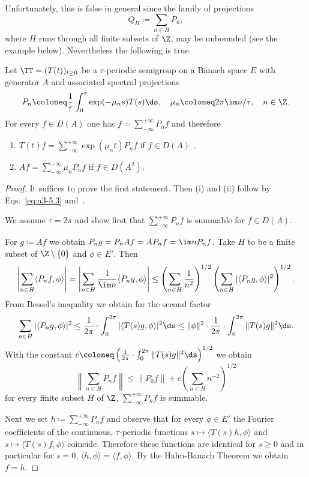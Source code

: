 Unfortunately, this is false in general since the family of projections
\[
Q_{H} \coloneq \sum_{n \in H} P_{n} ,
\]
where $H$ runs through all finite subsets of\/ $\Z$, may be unbounded (see the example below).
Nevertheless the following is true.
\begin{theorem}\label{thm:a3-5.4}
Let $\TT = (T(t))_{t \geq 0}$ be a $\tau$-periodic semigroup on a Banach space $E$ with generator $A$ and associated spectral projections
\[
P_{n} \coloneq  \frac{1}{\tau}\int_{0}^{\tau} \exp(-\mu_{n}s)T(s) \ds, \quad \mu_{n} \coloneq 2\pi\im n/\tau, \quad n \in \Z  .
\]
For every $f \in D(A)$ one has $f = \sum_{-\infty}^{+\infty} P_{n}f$ and therefore
\begin{enumerate}[\upshape (i)]
\item 
$T(t)f = \sum_{-\infty}^{+\infty} \exp(\mu_{n}t)P_{n}f$ \quad if\/ $f \in D(A)$ ,

\item 
$Af = \sum_{-\infty}^{+\infty} \mu_{n}P_{n}f$ \quad if\/ $f \in D(A^{2})$. 
\end{enumerate}
\end{theorem}
\begin{proof}
It suffices to prove the first statement. Then (i) and (ii) follow by Eqs.~\eqref{eq:a3-5.3} and~.

We assume $\tau = 2\pi$ and show first that $\sum_{-\infty}^{+\infty} P_{n}f$ is summable for $f \in D(A)$.

For $g \coloneq Af$ we obtain $P_{n}g = P_{n}Af = AP_{n}f = \im nP_{n}f$.
Take $H$ to be a finite subset of\/ $\Z \setminus \{0\}$ and $\phi \in E'$. Then
\[
\left|\sum_{n \in H} \langle P_{n}f,\phi \rangle\right|
= \left|\sum_{n \in H} \frac{1}{\im n} \langle P_{n}g,\phi \rangle\right| 
\leq \left(\sum_{n \in H} \frac{1}{n^2}\right)^{1/2}\left(\sum_{n \in H} |\langle P_{n}g,\phi \rangle|^{2}\right)^{1/2} .
\]
From Bessel's inequality we obtain for the second factor
\[
\sum_{n \in H} |\langle P_{n}g,\phi \rangle|^{2} \leq \frac{1}{2\pi} \cdot \int_{0}^{2\pi} |\langle T(s)g,\phi \rangle|^{2}  \ds 
\leq \|\phi\|^{2} \cdot \frac{1}{2\pi} \cdot \int_{0}^{2\pi} \|T(s)g\|^{2}  \ds  .
\]
With the constant $c \coloneq \left(\frac{1}{2\pi} \cdot \int_{0}^{2\pi} \|T(s)g\|^{2} \ds\right)^{1/2}$ we obtain
\[
\left\|\sum_{n \in H} P_{n}f\right\| \leq \|P_{0} f\|+c\left(\sum_{n \in H} n^{-2}\right)^{1/2}
\]
for every finite subset $H$ of\/ $\Z$, \ie $\sum_{-\infty}^{+\infty} P_{n}f$ is summable.

Next we set $h \coloneq \sum_{-\infty}^{+\infty} P_{n}f$ and observe that for every $\phi \in E'$ the Fourier coefficients of the continuous, $\tau$-periodic functions
$s \mapsto \langle T(s)h,\phi \rangle$ and $s \mapsto \langle T(s)f,\phi \rangle$
coincide.
Therefore these functions are identical for $s \geq 0$ and in particular for $s = 0$, \ie 
$\langle h, \phi \rangle = \langle f, \phi \rangle$.
By the Hahn-Banach Theorem we obtain $f = h$.
\end{proof}
